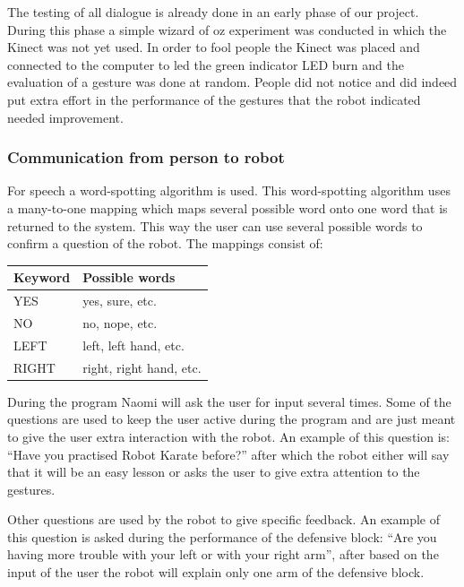 \documentclass[10pt,a4paper,oneside]{scrartcl}
\begin{document}
The testing of all dialogue is already done in an early phase of our project. 
During this phase a simple wizard of oz experiment was conducted in which the Kinect was not yet used. 
In order to fool people the Kinect was placed and connected to the computer to led the green indicator LED burn and the evaluation of a gesture was done at random. 
People did not notice and did indeed put extra effort in the performance of the gestures that the robot indicated needed improvement. 


\subsubsection{Communication from person to robot}
For speech a word-spotting algorithm is used.
This word-spotting algorithm uses a many-to-one mapping which maps several possible word onto one word that is returned to the system. 
This way the user can use several possible words to confirm a question of the robot. 
The mappings consist of: 
\begin{table}
  \begin{tabular}{|l|l|} \hline
    Keyword & Possible words           \\
    \hline 
    YES     & yes, sure, etc.          \\
    NO      & no, nope, etc.           \\
    LEFT    & left, left hand, etc.    \\
    RIGHT   & right, right hand, etc.  \\
    \hline
  \end{tabular}
\end{table}

During the program Naomi will ask the user for input several times. 
Some of the questions are used to keep the user active during the program and are just meant to give the user extra interaction with the robot. 
An example of this question is: ``Have you practised Robot Karate before?'' after which the robot either will say that it will be an easy lesson or asks the user to give extra attention to the gestures. 

Other questions are used by the robot to give specific feedback.
An example of this question is asked during the performance of the defensive block: ``Are you having more trouble with your left or with your right arm'', after based on the input of the user the robot will explain only one arm of the defensive block. 



\end{document}
